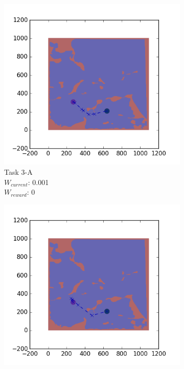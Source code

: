 \documentclass{tamuccthesis}
\begin{document}
\begin{figure}
    \begin{subfigure}[b]{0.24\textwidth}
        \centering
        \includegraphics[width=\textwidth,trim={4cm 3cm 2cm 3cm},clip]{EXP3RG_PathCa_-1_-1_0d001_0.png}
        \caption[]{{\small Task 3-A \\ $W_{current}$: 0.001 \\ $W_{reward}$: 0}}    
        \label{fig:Path_3-A_upCurrent_noReward}
    \end{subfigure}
    \begin{subfigure}[b]{0.24\textwidth}  
        \centering 
        \includegraphics[width=\textwidth,trim={4cm 3cm 2cm 3cm},clip]{EXP3RG_PathCa_-1_-1_0d001_-1.png}

\end{subfigure}
\end{figure}
\end{document}
